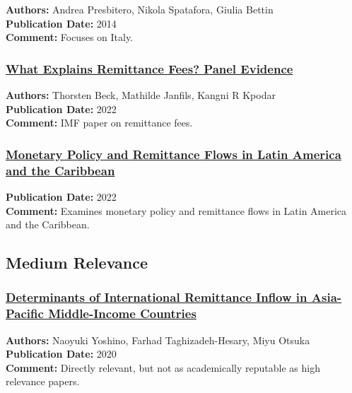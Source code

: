 \documentclass[
  11pt,
]{article}
\begin{document}
\textbf{Authors:} Andrea Presbitero, Nikola Spatafora, Giulia Bettin\\
\textbf{Publication Date:} 2014\\
\textbf{Comment:} Focuses on Italy.

\subsubsection{\texorpdfstring{\href{https://www.elibrary.imf.org/view/journals/001/2022/087/article-A001-en.xml}{What
Explains Remittance Fees? Panel
Evidence}}{What Explains Remittance Fees? Panel Evidence}}\label{what-explains-remittance-fees-panel-evidence}

\textbf{Authors:} Thorsten Beck, Mathilde Janfils, Kangni R Kpodar\\
\textbf{Publication Date:} 2022\\
\textbf{Comment:} IMF paper on remittance fees.

\subsubsection{\texorpdfstring{\href{https://pmc.ncbi.nlm.nih.gov/articles/PMC9510564/pdf/10290_2022_Article_478.pdf}{Monetary
Policy and Remittance Flows in Latin America and the
Caribbean}}{Monetary Policy and Remittance Flows in Latin America and the Caribbean}}\label{monetary-policy-and-remittance-flows-in-latin-america-and-the-caribbean}

\textbf{Publication Date:} 2022\\
\textbf{Comment:} Examines monetary policy and remittance flows in Latin
America and the Caribbean.

\subsection{Medium Relevance}\label{medium-relevance}

\subsubsection{\texorpdfstring{\href{https://www.sciencedirect.com/science/article/pii/S0313592620304094}{Determinants
of International Remittance Inflow in Asia-Pacific Middle-Income
Countries}}{Determinants of International Remittance Inflow in Asia-Pacific Middle-Income Countries}}\label{determinants-of-international-remittance-inflow-in-asia-pacific-middle-income-countries}

\textbf{Authors:} Naoyuki Yoshino, Farhad Taghizadeh-Hesary, Miyu
Otsuka\\
\textbf{Publication Date:} 2020\\
\textbf{Comment:} Directly relevant, but not as academically reputable
as high relevance papers.
\end{document}
